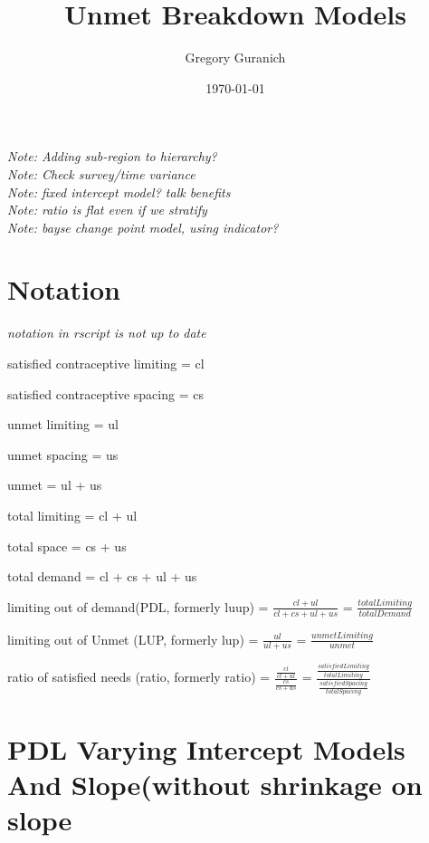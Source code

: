 \documentclass[12pt]{article}
\begin{document}
\title{Unmet Breakdown Models}
\author{Gregory Guranich}
\date{\today}
\maketitle
\tableofcontents
\hfill \break
\hfill \break
\noindent \textit{Note: Adding sub-region to hierarchy? }\\
\textit{Note: Check survey/time variance}\\
\textit{Note: fixed intercept model? talk benefits}\\
\textit{Note: ratio is flat even if we stratify}\\
\textit{Note: bayse change point model, using indicator?}\\

\newpage

\section{Notation}
\indent\textit{notation in rscript is not up to date}
\begin{description}
\item{satisfied contraceptive limiting = } cl
\item{satisfied contraceptive spacing = } cs
\item{unmet limiting = } ul
\item{unmet spacing = } us
\item{unmet = } ul + us
\item{total limiting = } cl + ul
\item{total space = } cs + us
\item{total demand = } cl + cs + ul + us
\item{limiting out of demand(PDL, formerly luup) = } $ \frac{cl + ul}{cl + cs + ul + us} $ = $ \frac{total Limiting}{total Demand} $
\item{limiting out of Unmet (LUP, formerly lup) = } $\frac{ul}{ul+us} $ = $ \frac{unmetLimiting}{unmet} $
\item{ratio of satisfied needs (ratio, formerly ratio) = } $\frac{\frac{cl}{cl+ul}}{\frac{cs}{cs+us}} $ = $\frac{\frac{satisfied Limiting}{total Limiting}}{\frac{satisfied Spacing}{total Spacing}} $ 
\item{}
\end{description}

\newpage

\section{PDL Varying Intercept Models And Slope(without shrinkage on slope}
\end{document}
